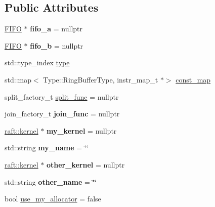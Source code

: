 \subsection*{Public Attributes}
\begin{DoxyCompactItemize}
\item 
\hypertarget{struct_port_info_af8148dcb4b8e6d355dbce4de10cc10cd}{}\label{struct_port_info_af8148dcb4b8e6d355dbce4de10cc10cd} 
\hyperlink{class_f_i_f_o}{F\+I\+FO} $\ast$ {\bfseries fifo\+\_\+a} = nullptr
\item 
\hypertarget{struct_port_info_a071d6f3662fd14dc6b3d12913eecd4ad}{}\label{struct_port_info_a071d6f3662fd14dc6b3d12913eecd4ad} 
\hyperlink{class_f_i_f_o}{F\+I\+FO} $\ast$ {\bfseries fifo\+\_\+b} = nullptr
\item 
std\+::type\+\_\+index \hyperlink{struct_port_info_a669818f0fde1da7b4a294c46e08d5980}{type}
\item 
std\+::map$<$ Type\+::\+Ring\+Buffer\+Type, instr\+\_\+map\+\_\+t $\ast$$>$ \hyperlink{struct_port_info_a714592b5ab1fa47b599903639b102a66}{const\+\_\+map}
\item 
split\+\_\+factory\+\_\+t \hyperlink{struct_port_info_a6b7e8758b84288a4378233251252be77}{split\+\_\+func} = nullptr
\item 
\hypertarget{struct_port_info_a79c530d0df178e81f8ced267162463ba}{}\label{struct_port_info_a79c530d0df178e81f8ced267162463ba} 
join\+\_\+factory\+\_\+t {\bfseries join\+\_\+func} = nullptr
\item 
\hypertarget{struct_port_info_a52680ae480484d347333615eb2100633}{}\label{struct_port_info_a52680ae480484d347333615eb2100633} 
\hyperlink{classraft_1_1kernel}{raft\+::kernel} $\ast$ {\bfseries my\+\_\+kernel} = nullptr
\item 
\hypertarget{struct_port_info_a52b0d512d88e2a2ca9efc2e6d3195526}{}\label{struct_port_info_a52b0d512d88e2a2ca9efc2e6d3195526} 
std\+::string {\bfseries my\+\_\+name} = \char`\"{}\char`\"{}
\item 
\hypertarget{struct_port_info_a68948477f69bccb9a273a02eaae782d4}{}\label{struct_port_info_a68948477f69bccb9a273a02eaae782d4} 
\hyperlink{classraft_1_1kernel}{raft\+::kernel} $\ast$ {\bfseries other\+\_\+kernel} = nullptr
\item 
\hypertarget{struct_port_info_a5a51ce33a630378cea7ef141efd41b95}{}\label{struct_port_info_a5a51ce33a630378cea7ef141efd41b95} 
std\+::string {\bfseries other\+\_\+name} = \char`\"{}\char`\"{}
\item 
bool \hyperlink{struct_port_info_a5da81ef07f28858445aa768700948cf2}{use\+\_\+my\+\_\+allocator} = false
$$
\end{DoxyCompactItemize}

